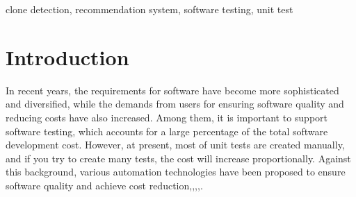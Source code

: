 \documentclass[conference]{IEEEtran}
\begin{document}
\begin{abstract}

\end{abstract}

\begin{IEEEkeywords}
 clone detection, recommendation system, software testing, unit test 
\end{IEEEkeywords}

\section{Introduction}
In recent years, the requirements for software have become more sophisticated and diversified, while the demands from users for ensuring software quality and reducing costs have also increased. Among them, it is important to support software testing, which accounts for a large percentage of the total software development cost\cite{b20}. However, at present, most of unit tests are created manually, and if you try to create many tests, the cost will increase proportionally. Against this background, various automation technologies have been proposed to ensure software quality and achieve cost reduction\cite{b3},\cite{b16},\cite{b17},\cite{b18},\cite{b19}. 
\end{document}

